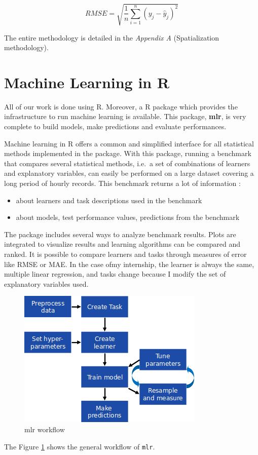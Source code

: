 \documentclass[12pt,twoside]{reedthesis}
\providecommand{\tightlist}{%
  \setlength{\itemsep}{0pt}\setlength{\parskip}{0pt}}
\theoremstyle{definition}
\theoremstyle{definition}
\theoremstyle{definition}
\theoremstyle{remark}
\begin{document}
\[
RMSE = \sqrt{\frac{1}{n} \sum_{i=1}^{n}{( y_{j} - \widehat{y}_{j} )^2}}
\]

The entire methodology is detailed in the \emph{Appendix A}
(Spatialization methodology).

\section{Machine Learning in R}\label{machine-learning-in-r}

All of our work is done using R. Moreover, a R package which provides
the infrastructure to run machine learning is available. This package,
\textbf{mlr}, is very complete to build models, make predictions and
evaluate performances.

Machine learning in R offers a common and simplified interface for all
statistical methods implemented in the package. With this package,
running a benchmark that compares several statistical methods, i.e.~a
set of combinations of learners and explanatory variables, can easily be
performed on a large dataset covering a long period of hourly records.
This benchmark returns a lot of information :
\begin{itemize}
\tightlist
\item
  about learners and task descriptions used in the benchmark
\item
  about models, test performance values, predictions from the benchmark
\end{itemize}
The package includes several ways to analyze benchmark results. Plots
are integrated to visualize results and learning algorithms can be
compared and ranked. It is possible to compare learners and tasks
through measures of error like RMSE or MAE. In the case ofmy internship,
the learner is always the same, multiple linear regression, and tasks
change because I modify the set of explanatory variables used.
\begin{figure}

{\centering \includegraphics[width=0.5\linewidth]{figure/mlr_workflow} 

}

\caption{mlr workflow}\label{fig:mlr}
\end{figure}
The Figure \ref{fig:mlr} shows the general workflow of \texttt{mlr}.
\end{document}
